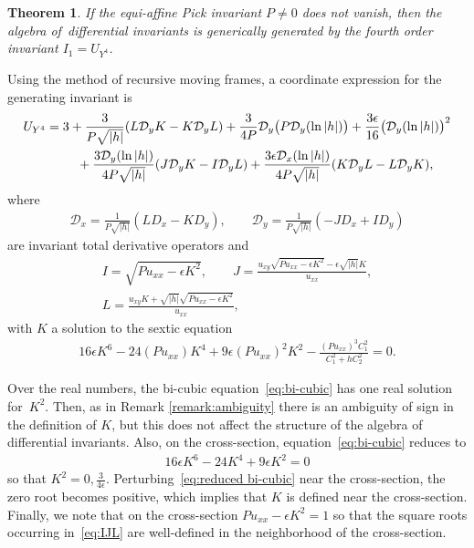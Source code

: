 \documentclass[10pt,a4paper]{amsart}
\numberwithin{equation}{section}
\newtheorem{Theorem}{Theorem}[section]
\newcommand{\D}{\mathcal{D}}
\begin{document}
\begin{Theorem}
If the equi-affine Pick invariant $P\neq0$ does not vanish, then the algebra of~dif\-ferential invariants is generically generated by the fourth order invariant $I_1=U_{Y^4}$.
\end{Theorem}


Using the method of recursive moving frames, a coordinate expression for the generating invariant is
\begin{gather*}
U_{Y^4} = 3 + \frac{3}{P\sqrt{|h|}}(L \D_y K - K \D_yL) +\frac{3}{4P}\D_y\big(P \D_y(\ln|h|)\big)+ \frac{3\epsilon}{16}\big(\D_y(\ln|h|)\big)^2
\\ \hphantom{U_{Y^4} =}
{}+\frac{3\D_y(\ln|h|)}{4P\sqrt{|h|}}(J \D_y K-I \D_y L) + \frac{3\epsilon\D_x(\ln|h|)}{4P\sqrt{|h|}}(K \D_y L - L \D_yK),
\end{gather*}
%
where
\begin{gather*}
\D_x = \frac{1}{P\sqrt{|h|}}(L D_x - K D_y),\qquad
\D_y = \frac{1}{P\sqrt{|h|}}(-J D_x + I D_y)
\end{gather*}
are invariant total derivative operators and
\begin{gather}
I = \sqrt{Pu_{xx}-\epsilon K^2},\qquad
J = \frac{u_{xy}\sqrt{Pu_{xx}-\epsilon K^2}-\epsilon \sqrt{|h|} K}{u_{xx}},\nonumber
\\
L = \frac{u_{xy}K+\sqrt{|h|}\sqrt{Pu_{xx}-\epsilon K^2}}{u_{xx}},
\label{eq:IJL}
\end{gather}
%
with $K$ a solution to the sextic equation
%
\begin{gather}\label{eq:bi-cubic}
16\epsilon K^6 - 24 (Pu_{xx})K^4+ 9\epsilon (Pu_{xx})^2 K^2 - \frac{(Pu_{xx})^3 C_1^2}{C_1^2+hC_2^2} =0.
\end{gather}

\begin{Remark}
Over the real numbers, the bi-cubic equation~\eqref{eq:bi-cubic} has one real solution for~$K^2$. Then, as in Remark \ref{remark:ambiguity} there is an ambiguity of sign in the definition of $K$, but this does not affect the structure of the algebra of differential invariants. Also, on the cross-section, equation~\eqref{eq:bi-cubic} reduces to
%
\begin{gather}\label{eq:reduced bi-cubic}
16\epsilon K^6-24K^4+9\epsilon K^2 = 0
\end{gather}
%
so that $K^2=0,\frac{3}{4\epsilon}$. Perturbing~\eqref{eq:reduced bi-cubic} near the cross-section, the zero root becomes positive, which implies that $K$ is defined near the cross-section. Finally, we note that on the cross-section $Pu_{xx}-\epsilon K^2 = 1$ so that the square roots occurring in~\eqref{eq:IJL} are well-defined in the neighborhood of the cross-section.
\end{Remark}
\end{document}
